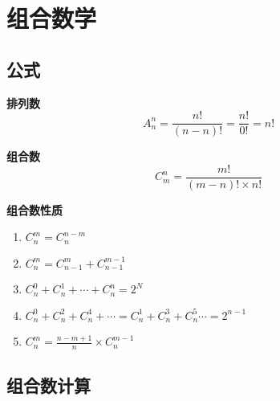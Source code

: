 \section{组合数学}
\subsection{公式}

\textbf{排列数}
\[
    A_{n}^{n} = \frac{n!}{(n-n)!} = \frac{n!}{0!} = n!
\]

\textbf{组合数}
\[
    C_{m}^{n} = \frac{m!}{(m-n)! \times n!}
\]

\textbf{组合数性质}
\begin{enumerate}
    \item $C_n^m=C_n^{n-m}$
    \item $C_n^m=C_{n-1}^{m}+C_{n-1}^{m-1}$
    \item $C_n^0+C_n^1+\cdots +C_n^n=2^N$
    \item $C_n^0+C_n^2+C_n^4+\cdots = C_n^1+C_n^3+C_n^5\cdots=2^{n-1}$
    \item $C_n^m=\frac{n-m+1}{n}\times C_n^{m-1}$
\end{enumerate}

\subsection{组合数计算}

